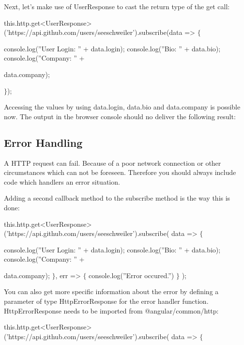 \documentclass[11pt,twoside]{article}
\begin{document}
\vspace{1\baselineskip}
Next, let's make use of UserResponse to cast the return type of the get call:

\vspace{1\baselineskip}
this.http.get<UserResponse>('https://api.github.com/users/seeschweiler').subscribe(data => $\{$

console.log(”User Login: ” + data.login); console.log(”Bio: ” + data.bio); console.log(”Company: ” +

data.company);

$\}$);

\vspace{1\baselineskip}
Accessing the values by using data.login, data.bio and data.company is possible now. The output in the browser console should no deliver the following result:

\vspace{2\baselineskip}
\subsection*{Error Handling}

\vspace{1\baselineskip}
A HTTP request can fail. Because of a poor network connection or other circumstances which can not be foreseen. Therefore you should always include code which handlers an error situation.

\vspace{1\baselineskip}
Adding a second callback method to the subscribe method is the way this is done:

\vspace{1\baselineskip}
this.http.get<UserResponse>('https://api.github.com/users/seeschweiler').subscribe( data => $\{$ 

console.log(”User Login: ” + data.login); console.log(”Bio: ” + data.bio); console.log(”Company: ” +

data.company); $\}$, err => $\{$ console.log(”Error occured.”) $\}$ );

\vspace{4\baselineskip}
You can also get more specific information about the error by defining a parameter of type HttpErrorResponse for the error handler function. HttpErrorResponse needs to be imported from @angular/common/http:

\vspace{1\baselineskip}
this.http.get<UserResponse>('https://api.github.com/users/seeschweiler').subscribe( data => $\{$ 
\end{document}
